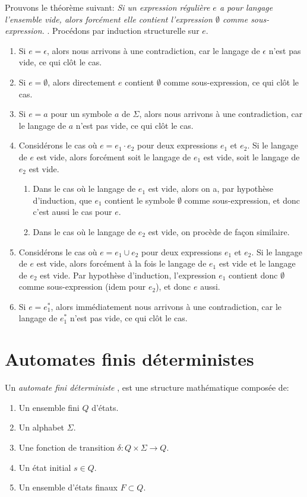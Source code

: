 Prouvons le théorème suivant: \og \textit{Si un expression régulière $e$ a pour langage l'ensemble vide, alors forcément elle contient l'expression $\emptyset$ comme sous-expression.} \fg.
Procédons par induction structurelle sur $e$.
\begin{enumerate}
\item Si $e = \epsilon$, alors nous arrivons à une contradiction, car le langage de $\epsilon$ n'est pas vide, ce qui clôt le cas.
\item Si $e = \emptyset$, alors directement $e$ contient $\emptyset$ comme sous-expression, ce qui clôt le cas.
\item Si $e = a$ pour un symbole $a$ de $\Sigma$, alors nous arrivons à une contradiction, car le langage de $a$ n'est pas vide, ce qui clôt le cas.
\item Considérons le cas où $e = e_1 \cdot e_2$ pour deux expressions $e_1$ et $e_2$.
      Si le langage de $e$ est vide, alors forcément soit le langage de $e_1$ est vide, soit le langage de $e_2$ est vide.
      \begin{enumerate}
      \item Dans le cas où le langage de $e_1$ est vide, alors on a, par hypothèse d'induction,
            que $e_1$ contient le symbole $\emptyset$ comme sous-expression, et donc c'est aussi le cas pour $e$.
      \item Dans le cas où le langage de $e_2$ est vide, on procède de façon similaire.
      \end{enumerate}
\item Considérons le cas où $e = e_1 \cup e_2$ pour deux expressions $e_1$ et $e_2$.
      Si le langage de $e$ est vide, alors forcément à la fois le langage de $e_1$ est vide et le langage de $e_2$ est vide.
      Par hypothèse d'induction, l'expression $e_1$ contient donc $\emptyset$ comme sous-expression (idem pour $e_2$), et donc $e$ aussi.
\item Si $e = e_1^*$, alors immédiatement nous arrivons à une contradiction, car le langage de $e_1^*$ n'est pas vide, ce qui clôt le cas.
\end{enumerate}

\section{Automates finis déterministes}

Un \og \textit{automate fini déterministe} \fg{}, est une structure mathématique composée de:
\begin{enumerate}
\item Un ensemble fini $Q$ d'états.
\item Un alphabet $\Sigma$.
\item Une fonction de transition $\delta : Q \times \Sigma \to Q$.
\item Un état initial $s \in Q$.
\item Un ensemble d'états finaux $F \subset Q$.
\end{enumerate}

